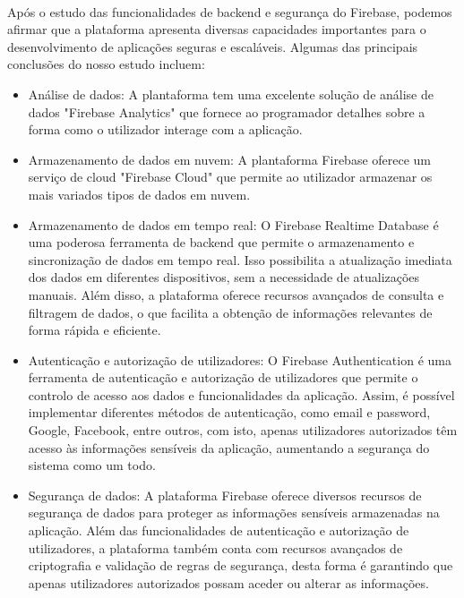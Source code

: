 \documentclass[runningheads]{llncs}
\begin{document}
\paragraph{}
Após o estudo das funcionalidades de backend e segurança do Firebase, podemos afirmar que a plataforma apresenta diversas capacidades importantes para o desenvolvimento de aplicações seguras e escaláveis. Algumas das principais conclusões do nosso estudo incluem:
\begin{itemize}

      \item Análise de dados: A plantaforma tem uma excelente solução de análise de dados "Firebase Analytics" que fornece ao programador detalhes sobre a forma como o utilizador interage com a aplicação.\cite{6}
      
      \item Armazenamento de dados em nuvem: A plantaforma Firebase oferece um serviço de cloud "Firebase Cloud" que permite ao utilizador armazenar os mais variados tipos de dados em nuvem.\cite{6}
      
      \item Armazenamento de dados em tempo real: O Firebase Realtime Database é uma poderosa ferramenta de backend que permite o armazenamento e sincronização de dados em tempo real. Isso possibilita a atualização imediata dos dados em diferentes dispositivos, sem a necessidade de atualizações manuais. Além disso, a plataforma oferece recursos avançados de consulta e filtragem de dados, o que facilita a obtenção de informações relevantes de forma rápida e eficiente.\cite{6}

      \item Autenticação e autorização de utilizadores: O Firebase Authentication é uma ferramenta de autenticação e autorização de utilizadores que permite o controlo de acesso aos dados e funcionalidades da aplicação. Assim, é possível implementar diferentes métodos de autenticação, como email e password, Google, Facebook, entre outros, com isto, apenas utilizadores autorizados têm acesso às informações sensíveis da aplicação, aumentando a segurança do sistema como um todo. \cite{7}

      \item Segurança de dados: A plataforma Firebase oferece diversos recursos de segurança de dados para proteger as informações sensíveis armazenadas na aplicação. Além das funcionalidades de autenticação e autorização de utilizadores, a plataforma também conta com recursos avançados de criptografia e validação de regras de segurança, desta forma é garantindo que apenas utilizadores autorizados possam aceder ou alterar as informações. \cite{6}

\end{itemize}
\end{document}
